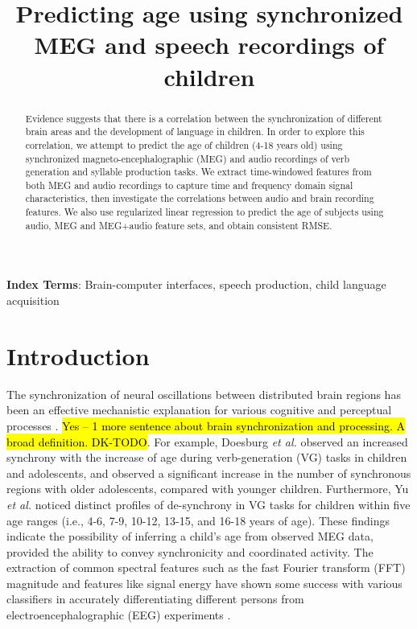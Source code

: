 \documentclass[a4paper]{article}
\title{Predicting age using synchronized MEG and speech recordings of children}
\newcommand{\FR}[1]{{\small \textcolor{red}{\hl{#1}}}}
\begin{document}
\maketitle
% 
\begin{abstract}
Evidence suggests that there is a correlation between the synchronization of different brain areas and the development of language in children. In order to explore this correlation, we attempt to predict the age of children (4-18 years old) using synchronized magneto-encephalographic (MEG) and audio recordings of verb generation and syllable production tasks. We extract time-windowed features from both MEG and audio recordings to capture time and frequency domain signal characteristics, then investigate the correlations between audio and brain recording features. We also use regularized linear regression to predict the age of subjects using audio, MEG and MEG+audio feature sets, and obtain consistent RMSE.
\end{abstract}


\noindent\textbf{Index Terms}: Brain-computer interfaces, speech production, child language acquisition

\section{Introduction}

The synchronization of neural oscillations between distributed brain regions has been an effective mechanistic explanation for various cognitive and perceptual processes \cite{Fries2015,Nakasaki1989,NeuralSync}. \FR{Yes -- 1 more sentence about brain synchronization and processing. A broad definition. DK-TODO}. For example, Doesburg {\em et al.} \cite{Doesburg2016} observed an increased synchrony with the increase of age during verb-generation (VG) tasks in children and adolescents, and observed a significant increase in the number of synchronous regions with older adolescents, compared with younger children. Furthermore, Yu {\em et al.} \cite{Yu2014} noticed distinct profiles of de-synchrony in VG tasks for children within five age ranges (i.e., 4-6, 7-9, 10-12, 13-15, and 16-18 years of age). These findings indicate the possibility of inferring a child's age from observed MEG data, provided the ability to convey synchronicity and coordinated activity. The extraction of common spectral features such as the fast Fourier transform (FFT) magnitude and features like signal energy have shown some success with various classifiers in accurately differentiating different persons from electroencephalographic (EEG) experiments \cite{Nguyen2012, Poulos2001}.
\end{document}
